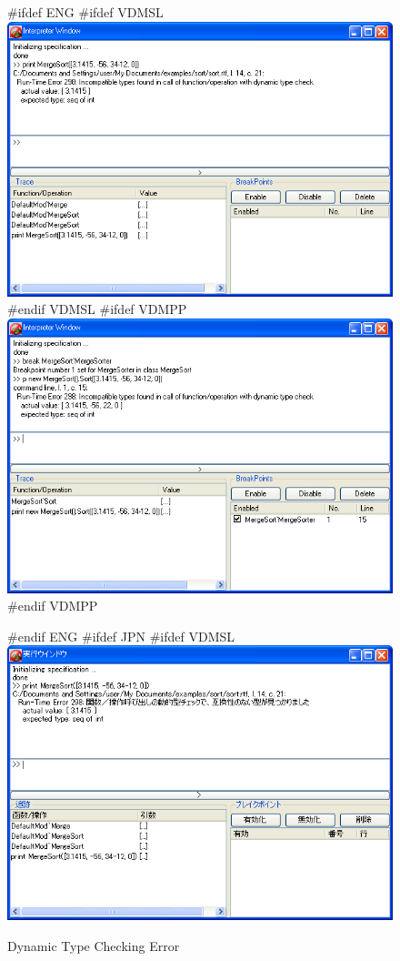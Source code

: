 \documentclass[\pformat,12pt]{article}
\begin{document}
\begin{figure}[tbh]
\begin{center}
#ifdef ENG
#ifdef VDMSL
\includegraphics[width=12.5cm]{dynamicTCError-slENG.png}
#endif VDMSL
#ifdef VDMPP
\includegraphics[width=12.5cm]{dynamicTCError-ppENG.png}
#endif VDMPP
\caption{Dynamic Type Checking Error}
#endif ENG
#ifdef JPN
#ifdef VDMSL
\includegraphics[width=12.5cm]{dynamicTCError-sl.png}

\end{center}
\end{figure}
\end{document}
